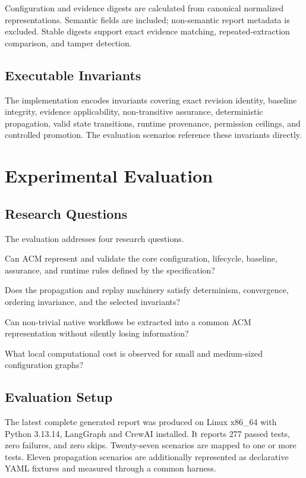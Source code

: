 \documentclass[10pt]{article}
\begin{document}
Configuration and evidence digests are calculated from canonical normalized representations. Semantic fields are included; non-semantic report metadata is excluded. Stable digests support exact evidence matching, repeated-extraction comparison, and tamper detection.

\subsection{Executable Invariants}

The implementation encodes invariants covering exact revision identity, baseline integrity, evidence applicability, non-transitive assurance, deterministic propagation, valid state transitions, runtime provenance, permission ceilings, and controlled promotion. The evaluation scenarios reference these invariants directly.

\section{Experimental Evaluation}
\label{sec:evaluation}

\subsection{Research Questions}

The evaluation addresses four research questions.

\begin{description}[leftmargin=12mm,style=nextline]
  \item[RQ1:] Can ACM represent and validate the core configuration, lifecycle, baseline, assurance, and runtime rules defined by the specification?
  \item[RQ2:] Does the propagation and replay machinery satisfy determinism, convergence, ordering invariance, and the selected invariants?
  \item[RQ3:] Can non-trivial native workflows be extracted into a common ACM representation without silently losing information?
  \item[RQ4:] What local computational cost is observed for small and medium-sized configuration graphs?
\end{description}

\subsection{Evaluation Setup}

The latest complete generated report was produced on Linux x86\_64 with Python 3.13.14, LangGraph and CrewAI installed. It reports 277 passed tests, zero failures, and zero skips. Twenty-seven scenarios are mapped to one or more tests. Eleven propagation scenarios are additionally represented as declarative YAML fixtures and measured through a common harness.
\end{document}
